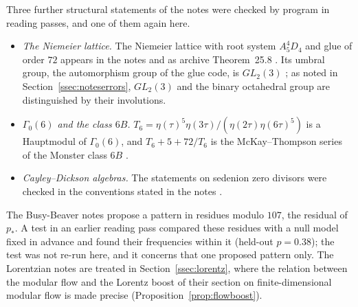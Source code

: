 Three further structural statements of the notes were checked by program in reading passes, and one of them again here.
\begin{itemize}
\item \emph{The Niemeier lattice.} The Niemeier lattice with root system $A_5^4D_4$ and glue of order $72$ appears in the notes and as archive Theorem~25.8 \cite{ConwaySloane}. Its umbral group, the automorphism group of the glue code, is $GL_2(3)$ \cite{CDH}; as noted in Section~\ref{ssec:noteserrors}, $GL_2(3)$ and the binary octahedral group are distinguished by their involutions.
\item \emph{$\Gamma_0(6)$ and the class $6B$.} $T_6=\eta(\tau)^5\eta(3\tau)/(\eta(2\tau)\eta(6\tau)^5)$ is a Hauptmodul of $\Gamma_0(6)$, and $T_6+5+72/T_6$ is the McKay--Thompson series of the Monster class $6B$ \cite{ConwayNorton}.
\item \emph{Cayley--Dickson algebras.} The statements on sedenion zero divisors were checked in the conventions stated in the notes \cite{Moreno,BaezOctonions}.
\end{itemize}
The Busy-Beaver notes propose a pattern in residues modulo $107$, the residual of $p_*$. A test in an earlier reading pass compared these residues with a null model fixed in advance and found their frequencies within it (held-out $p=0.38$); the test was not re-run here, and it concerns that one proposed pattern only. The Lorentzian notes are treated in Section~\ref{ssec:lorentz}, where the relation between the modular flow and the Lorentz boost of their section on finite-dimensional modular flow is made precise (Proposition~\ref{prop:flowboost}).
